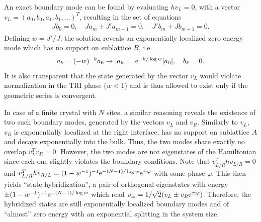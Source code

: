 An exact boundary mode can be found by evaluating $hv_L=0$, with a vector $v_L = (a_0,b_0,a_1,b_1,\dots)^T$, resulting in the set of equations
\begin{align}
    J b_0 = 0,
    \quad
    Ja_m + J' a_{m+1} = 0,
    \quad
    J' b_m + J b_{m+1} = 0.
\end{align}
Defining $w=J'/J$, the solution reveals an exponentially localized zero energy mode which has no support on sublattice $B$, i.e.
\begin{align}
    a_k=(-w)^{-k} a_0 \rightarrow |a_k| = \mathrm e^{-k/\log w}|a_0|,
    \quad
    b_k = 0.
    \label{eq:boundary_mode}
\end{align}
It is also transparent that the state generated by the vector $v_L$ would violate normalization in the TRI phase ($w<1$) and is thus allowed to exist only if the geometric series is convergent.

In case of a finite crystal with $N$ sites, a similar reasoning reveals the existence of two such boundary modes, generated by the vectors $v_L$ and $v_R$.
Similarly to $v_L$, $v_R$ is exponentially localized at the right interface, has no support on sublattice $A$ and decays exponentially into the bulk.
Thus, the two modes share exactly no overlap $v_L^T v_R = 0$.
However, the two modes are not eigenstates of the Hamiltonian since each one slightly violates the boundary conditions.
Note that $v_{L/R}^T h v_{L/R} = 0$ and $v_{L/R}^T h v_{R/L} = (1-w^{-1})^{-1}\mathrm e^{-(N-1)/\log w}\mathrm e^{\pm\varphi}$ with some phase $\varphi$.
This then yields ``state hybridization'', a pair of orthogonal eigenstates with energy $\pm(1-w^{-1})^{-1}\mathrm e^{-(N-1)/\log w}$ which read $v_\pm = 1/\sqrt2(v_L \pm v_R\mathrm e^{\pm\varphi})$.
Therefore, the hybridized states are still exponentially localized boundary modes and of ``almost'' zero energy with an exponential splitting in the system size.
%
%
